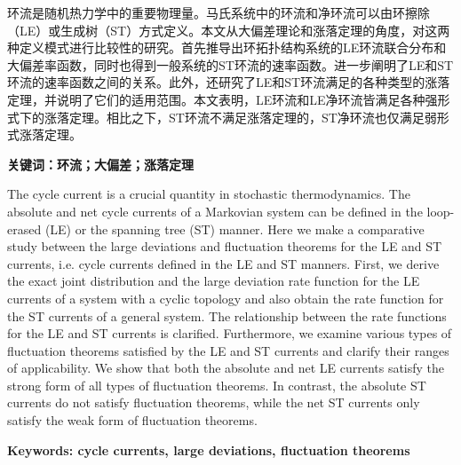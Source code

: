 
\setcounter{page}{1}
\song{}

环流是随机热力学中的重要物理量。马氏系统中的环流和净环流可以由环擦除（LE）或生成树（ST）方式定义。本文从大偏差理论和涨落定理的角度，对这两种定义模式进行比较性的研究。首先推导出环拓扑结构系统的LE环流联合分布和大偏差率函数，同时也得到一般系统的ST环流的速率函数。进一步阐明了LE和ST环流的速率函数之间的关系。此外，还研究了LE和ST环流满足的各种类型的涨落定理，并说明了它们的适用范围。本文表明，LE环流和LE净环流皆满足各种强形式下的涨落定理。相比之下，ST环流不满足涨落定理的，ST净环流也仅满足弱形式涨落定理。

\vspace{\baselineskip}

\hangindent=52.3pt\noindent
{\bfseries\xiaosi\song 关键词：环流；大偏差；涨落定理}
\clearpage


The cycle current is a crucial quantity in stochastic thermodynamics. The absolute and net cycle currents of a Markovian system can be defined in the loop-erased (LE) or the spanning tree (ST) manner. Here we make a comparative study between the large deviations and fluctuation theorems for the LE and ST currents, i.e. cycle currents defined in the LE and ST manners. First, we derive the exact joint distribution and the large deviation rate function for the LE currents of a system with a cyclic topology and also obtain the rate function for the ST currents of a general system. The relationship between the rate functions for the LE and ST currents is clarified. Furthermore, we examine various types of fluctuation theorems satisfied by the LE and ST currents and clarify their ranges of applicability. We show that both the absolute and net LE currents satisfy the strong form of all types of fluctuation theorems. In contrast, the absolute ST currents do not satisfy fluctuation theorems, while the net ST currents only satisfy the weak form of fluctuation theorems.

\vspace{\baselineskip}

\hangindent=60pt\noindent
{\textbf{\xiaosi Keywords: cycle currents, large deviations, fluctuation theorems}}
\clearpage
